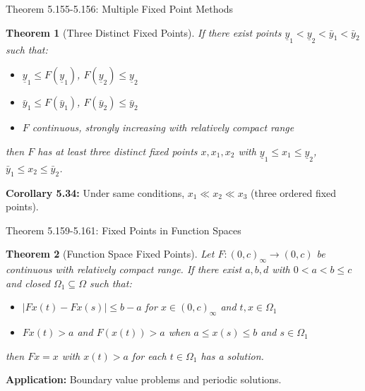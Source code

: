 \documentclass[aspectratio=169,10pt]{beamer}
\theoremstyle{plain}
\newtheorem*{theorem*}{Theorem}
\begin{document}
\begin{frame}{Theorem 5.155-5.156: Multiple Fixed Point Methods}
  \begin{theorem*}[Three Distinct Fixed Points]
    If there exist points $\underline{y}_1 < \underline{y}_2 < \bar{y}_1 < \bar{y}_2$ such that:
    \begin{itemize}
      \item $\underline{y}_1 \leq F(\underline{y}_1)$, $F(\underline{y}_2) \leq \underline{y}_2$
      \item $\bar{y}_1 \leq F(\bar{y}_1)$, $F(\bar{y}_2) \leq \bar{y}_2$
      \item $F$ continuous, strongly increasing with relatively compact range
    \end{itemize}

    then $F$ has at least three distinct fixed points $x, x_1, x_2$ with
    $\underline{y}_1 \leq x_1 \leq \underline{y}_2$, $\bar{y}_1 \leq x_2 \leq \bar{y}_2$.
  \end{theorem*}

  \vspace{1em}

  \textbf{Corollary 5.34:} Under same conditions, $x_1 \ll x_2 \ll x_3$ (three ordered fixed points).
\end{frame}

\begin{frame}{Theorem 5.159-5.161: Fixed Points in Function Spaces}
  \begin{theorem*}[Function Space Fixed Points]
    Let $F: (0,c)_\infty \to (0,c)$ be continuous with relatively compact range.
    If there exist $a, b, d$ with $0 < a < b \leq c$ and closed $\Omega_1 \subseteq \Omega$ such that:
    \begin{itemize}
      \item $|Fx(t) - Fx(s)| \leq b - a$ for $x \in (0,c)_\infty$ and $t,x \in \Omega_1$
      \item $Fx(t) > a$ and $F(x(t)) > a$ when $a \leq x(s) \leq b$ and $s \in \Omega_1$
    \end{itemize}

    then $Fx = x$ with $x(t) > a$ for each $t \in \Omega_1$ has a solution.
  \end{theorem*}

  \vspace{1em}

  \textbf{Application:} Boundary value problems and periodic solutions.
\end{frame}
\end{document}
